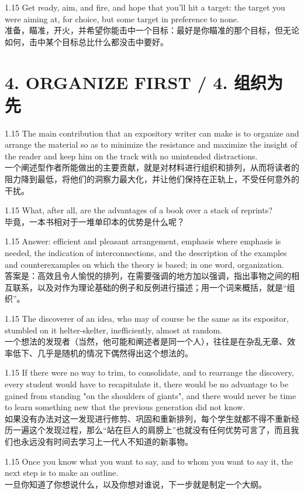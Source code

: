 \documentclass[12pt,a4paper]{article}
\newcommand{\bilingual}[2]{
    \begin{spacing}{1.15} %
        \noindent \normalsize #1 \\[-0.5ex] %
        \small \textcolor{blue!70!black}{#2} %
    \end{spacing}
    \vspace{0.8em} %
}
\begin{document}
\bilingual{Get ready, aim, and fire, and hope that you'll hit a target: the target you were aiming at, for choice, but some target in preference to none.}
{准备，瞄准，开火，并希望你能击中一个目标：最好是你瞄准的那个目标，但无论如何，击中某个目标总比什么都没击中要好。} %

\section*{4. ORGANIZE FIRST / 4. 组织为先} %

\bilingual{The main contribution that an expository writer can make is to organize and arrange the material so as to minimize the resistance and maximize the insight of the reader and keep him on the track with no unintended distractions.}
{一个阐述型作者所能做出的主要贡献，就是对材料进行组织和排列，从而将读者的阻力降到最低，将他们的洞察力最大化，并让他们保持在正轨上，不受任何意外的干扰。} %

\bilingual{What, after all, are the advantages of a book over a stack of reprints?}
{毕竟，一本书相对于一堆单印本的优势是什么呢？} %

\bilingual{Answer: efficient and pleasant arrangement, emphasis where emphasis is needed, the indication of interconnections, and the description of the examples and counterexamples on which the theory is based; in one word, organization.}
{答案是：高效且令人愉悦的排列，在需要强调的地方加以强调，指出事物之间的相互联系，以及对作为理论基础的例子和反例进行描述；用一个词来概括，就是“组织”。} %

\bilingual{The discoverer of an idea, who may of course be the same as its expositor, stumbled on it helter-skelter, inefficiently, almost at random.}
{一个想法的发现者（当然，他可能和阐述者是同一个人），往往是在杂乱无章、效率低下、几乎是随机的情况下偶然得出这个想法的。} %

\bilingual{If there were no way to trim, to consolidate, and to rearrange the discovery, every student would have to recapitulate it, there would be no advantage to be gained from standing "on the shoulders of giants", and there would never be time to learn something new that the previous generation did not know.}
{如果没有办法对这一发现进行修剪、巩固和重新排列，每个学生就都不得不重新经历一遍这个发现过程，那么“站在巨人的肩膀上”也就没有任何优势可言了，而且我们也永远没有时间去学习上一代人不知道的新事物。} %

\bilingual{Once you know what you want to say, and to whom you want to say it, the next step is to make an outline.}
{一旦你知道了你想说什么，以及你想对谁说，下一步就是制定一个大纲。} %
\end{document}
